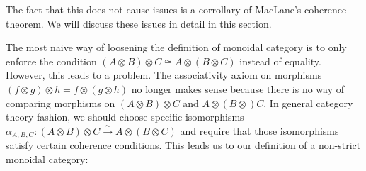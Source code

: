 The fact that this does not cause issues is a corrollary of MacLane's coherence theorem. We will discuss these issues in detail in this section.

The most naive way of loosening the definition of monoidal category is to only enforce the condition $(A\otimes B)\otimes C\cong A\otimes (B\otimes C)$ instead of equality. However, this leads to a problem. The associativity axiom on morphisms $(f\otimes g)\otimes h = f\otimes (g\otimes h)$  no longer makes sense because there is no way of comparing morphisms on $(A\otimes B)\otimes C$ and $A\otimes (B\otimes )C$. In general category theory fashion, we should choose specific isomorphisms $\alpha_{A,B,C}:(A\otimes B)\otimes C\xrightarrow{\sim} A\otimes (B\otimes C)$ and require that  those isomorphisms satisfy certain coherence conditions. This leads us to our definition of a non-strict monoidal category:

